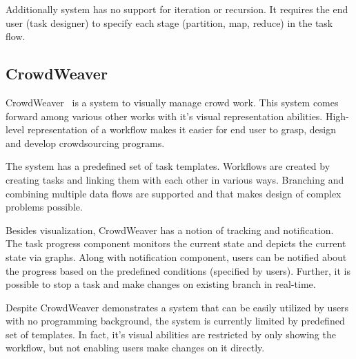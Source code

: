 Additionally system has no support for iteration or recursion. It requires the 
end user (task designer) to specify each stage (partition, map, reduce) in the task flow.


\subsection{CrowdWeaver}
CrowdWeaver~\cite{Kittur2012} is a system to visually manage crowd work. 
This system comes forward among various other works with it's visual representation 
abilities. High-level representation of a workflow makes it easier for end user to grasp, 
design and develop crowdsourcing programs.

The system has a predefined set of task templates. Workflows are created by 
creating tasks and linking them with each other in various ways. Branching and 
combining multiple data flows are supported and that makes design of complex 
problems possible. 

Besides visualization, CrowdWeaver has a notion of tracking and notification. 
The task progress component monitors the current state and depicts the current state
via graphs. Along with notification component, users can be notified about the 
progress based on the predefined conditions (specified by users). Further, 
it is possible to stop a task and make changes on existing branch in real-time. 

Despite CrowdWeaver demonstrates a system that can be easily utilized by users 
with no programming background, the system is currently limited by predefined set 
of templates. In fact, it's visual abilities are restricted by only showing the workflow, 
but not enabling users make changes on it directly.



